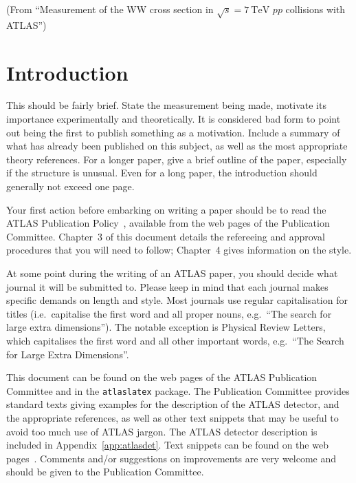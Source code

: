 \documentclass[PAPER,UKenglish,texlive=2016]{\ATLASLATEXPATH atlasdoc}
\begin{document}
\noindent(From \enquote{Measurement of the WW cross section in $\sqrt{s} = \SI{7}{\TeV}$ $pp$ collisions with ATLAS})


\section{Introduction}
\label{sec:intro}

This should be fairly brief.
State the measurement being made, motivate its importance experimentally and theoretically.
It is considered bad form to point out being the first to publish something as a motivation.
Include a summary of what has already been published on this subject,
as well as the most appropriate theory references.
For a longer paper, give a brief outline of the paper, especially if the structure is unusual.
Even for a long paper, the introduction should generally not exceed one page.

Your first action before embarking on writing a paper should be to
read the ATLAS Publication Policy~\cite{publication-policy}, available
from the web pages of the Publication Committee. Chapter~3 of this
document details the refereeing and approval procedures that you will
need to follow; Chapter~4 gives information on the style.

At some point during the writing of an ATLAS paper, you should decide what journal it will be submitted to.
Please keep in mind that each journal makes specific demands on length and style.
Most journals use regular capitalisation for titles
(i.e.\ capitalise the first word and all proper nouns,
e.g.\ \enquote{The search for large extra dimensions}).
The notable exception is Physical Review Letters, which capitalises the
first word and all other important words,
e.g.\ \enquote{The Search for Large Extra Dimensions}.

This document can be found on the web pages of the ATLAS Publication Committee
and in the \texttt{atlaslatex} package.
The Publication Committee provides standard texts giving examples
for the description of the ATLAS detector, and the appropriate references,
as well as other text snippets that may be useful to avoid too much use of ATLAS jargon.
The ATLAS detector description is included in Appendix~\ref{app:atlasdet}.
Text snippets can be found on the web pages~\cite{pubcom-snippet}.
Comments and/or suggestions on improvements are very welcome and
should be given to the Publication Committee.
\end{document}
